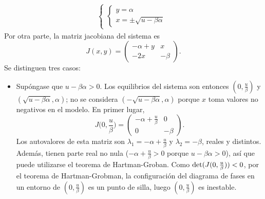 \documentclass[11pt]{report}
\begin{document}
\begin{solution}
\begin{enumerate}
\begin{align*}
\begin{cases}
                \begin{cases}
                y = \alpha \\
                x = \pm\sqrt{u-\beta\alpha}
                \end{cases}
            \end{cases}
        \end{align*}
        Por otra parte, la matriz jacobiana del sistema es
        \[J(x,y) = \left(\begin{array}{cc}
            -\alpha+y & x \\
            -2x & -\beta
        \end{array}\right).\]
        Se distinguen tres casos:
        \begin{itemize}
            \item Supóngase que $u-\beta\alpha > 0$. Los equilibrios del sistema son entonces $(0,\frac{u}{\beta})$ y $(\sqrt{u-\beta\alpha},\alpha)$; no se considera $(-\sqrt{u-\beta\alpha},\alpha)$ porque $x$ toma valores no negativos en el modelo. En primer lugar,
            \[J\bigl(0,\frac{u}{\beta}\bigr) = \left(\begin{array}{cc}
            -\alpha+\frac{u}{\beta} & 0 \\
            0 & -\beta
            \end{array}\right).\]
            Los autovalores de esta matriz son $\lambda_ 1= -\alpha+\frac{u}{\beta}$ y $\lambda_2 = -\beta$, reales y distintos. Además, tienen parte real no nula ($-\alpha+\frac{u}{\beta} >0$ porque $u-\beta\alpha>0$), así que puede utilizarse el teorema de Hartman-Groban. Como $\textup{det}(J(0,\frac{u}{\beta})) < 0$, por el teorema de Hartman-Grobman, la configuración del diagrama de fases en un entorno de $(0,\frac{u}{\beta})$ es un punto de silla, luego $(0,\frac{u}{\beta})$ es inestable.


\end{itemize}
\end{enumerate}
\end{solution}
\end{document}
